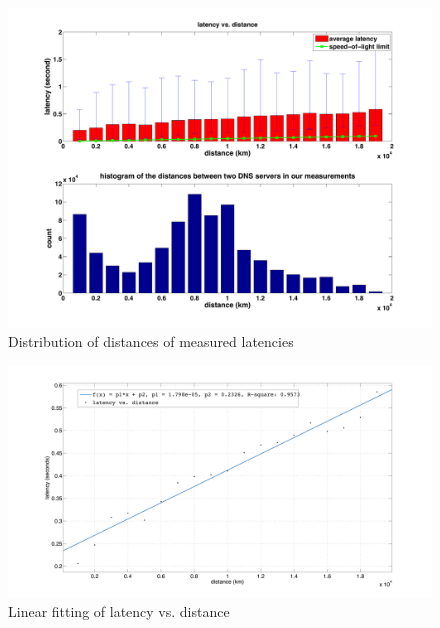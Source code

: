 \begin{figure}
  \centering
  \includegraphics[width=\linewidth]{../figs/King_distance_distrbution.pdf}
  \caption{Distribution of distances of measured latencies}
  \label{fig:latency_distance_distribution}
\end{figure}

\begin{figure}
  \centering
  \includegraphics[width=\linewidth]{../figs/fit_curve.pdf}
  \caption{Linear fitting of latency vs. distance}
  \label{fig:fit_curve}
\end{figure}


